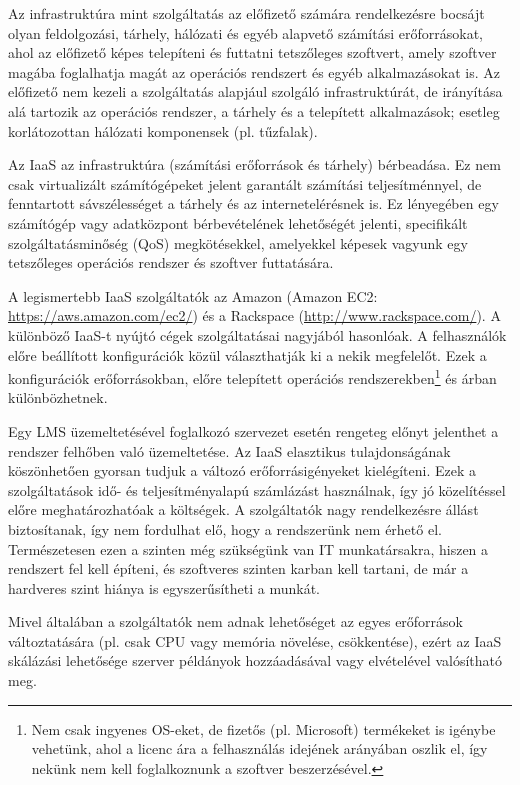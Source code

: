 Az infrastruktúra mint szolgáltatás az előfizető számára rendelkezésre bocsájt olyan feldolgozási, tárhely, hálózati és egyéb alapvető számítási erőforrásokat, ahol az előfizető képes telepíteni és futtatni tetszőleges szoftvert, amely szoftver magába foglalhatja magát az operációs rendszert és egyéb alkalmazásokat is. Az előfizető nem kezeli a szolgáltatás alapjául szolgáló infrastruktúrát, de irányítása alá tartozik az operációs rendszer, a tárhely és a telepített alkalmazások; esetleg korlátozottan hálózati komponensek (pl. tűzfalak)\cite{nistsp800-145}.

Az IaaS az infrastruktúra (számítási erőforrások és tárhely) bérbeadása. Ez nem csak virtualizált számítógépeket jelent garantált számítási teljesítménnyel, de fenntartott sávszélességet a tárhely és az internetelérésnek is. Ez lényegében egy számítógép vagy adatközpont bérbevételének lehetőségét jelenti, specifikált szolgáltatásminőség (QoS) megkötésekkel, amelyekkel képesek vagyunk egy tetszőleges operációs rendszer és szoftver futtatására\cite{ccwlinux}.

A legismertebb IaaS szolgáltatók az Amazon (Amazon EC2: \href{https://aws.amazon.com/ec2/}{https://aws.amazon.com/ec2/}) és a Rackspace (\href{http://www.rackspace.com/}{http://www.rackspace.com/}). A különböző IaaS-t nyújtó cégek szolgáltatásai nagyjából hasonlóak. A felhasználók előre beállított konfigurációk közül választhatják ki a nekik megfelelőt. Ezek a konfigurációk erőforrásokban, előre telepített operációs rendszerekben\footnote{Nem csak ingyenes OS-eket, de fizetős (pl. Microsoft) termékeket is igénybe vehetünk, ahol a licenc ára a felhasználás idejének arányában oszlik el, így nekünk nem kell foglalkoznunk a szoftver beszerzésével.} és árban különbözhetnek.

Egy LMS üzemeltetésével foglalkozó szervezet esetén rengeteg előnyt jelenthet a rendszer felhőben való üzemeltetése. Az IaaS elasztikus tulajdonságának köszönhetően gyorsan tudjuk a változó erőforrásigényeket kielégíteni. Ezek a szolgáltatások idő- és teljesítményalapú számlázást használnak, így jó közelítéssel előre meghatározhatóak a költségek. A szolgáltatók nagy rendelkezésre állást biztosítanak, így nem fordulhat elő, hogy a rendszerünk nem érhető el. Természetesen ezen a szinten még szükségünk van IT munkatársakra, hiszen a rendszert fel kell építeni, és szoftveres szinten karban kell tartani, de már a hardveres szint hiánya is egyszerűsítheti a munkát.

Mivel általában a szolgáltatók nem adnak lehetőséget az egyes erőforrások változtatására (pl. csak CPU vagy memória növelése, csökkentése), ezért 
az IaaS skálázási lehetősége szerver példányok hozzáadásával vagy elvételével valósítható meg.
